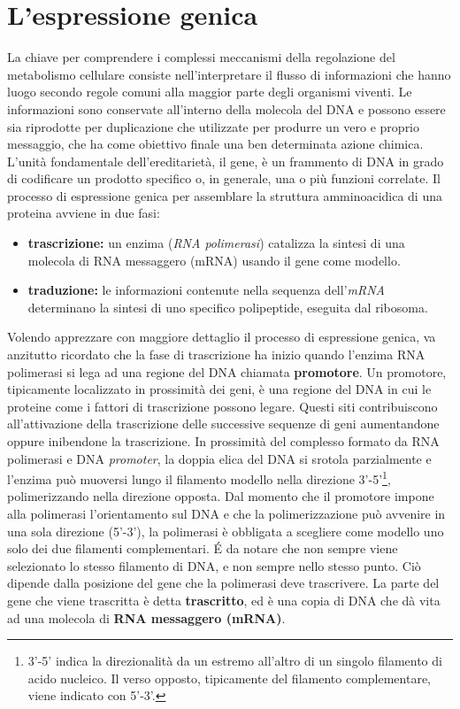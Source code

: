 \section{L'espressione genica}
\label{sec:genica}
La chiave per comprendere i complessi meccanismi della regolazione del metabolismo cellulare consiste nell'interpretare il flusso di informazioni che hanno luogo secondo regole comuni alla maggior parte degli organismi viventi. Le informazioni sono conservate all'interno della molecola del DNA e possono essere sia riprodotte per duplicazione che utilizzate per produrre un vero e proprio messaggio, che ha come obiettivo finale una ben determinata azione chimica. 
L'unità fondamentale dell'ereditarietà, il gene, è un frammento di DNA in grado di codificare un prodotto specifico o, in generale, una o più funzioni correlate. 
Il processo di espressione genica per assemblare la struttura amminoacidica di una proteina avviene in due fasi:
\begin{itemize}
\item \textbf{trascrizione:} un enzima (\textit{RNA polimerasi}) catalizza la sintesi di una molecola di RNA messaggero (mRNA) usando il gene come modello.
\item \textbf{traduzione:} le informazioni contenute nella sequenza dell'\textit{mRNA} determinano la sintesi di uno specifico polipeptide, eseguita dal ribosoma.
\end{itemize}

Volendo apprezzare con maggiore dettaglio il processo di espressione genica, va anzitutto ricordato che la fase di trascrizione ha inizio quando l'enzima RNA polimerasi si lega ad una regione del DNA chiamata \textbf{promotore}. 
Un promotore, tipicamente localizzato in prossimità dei geni, è una regione del DNA in cui le proteine come i fattori di trascrizione possono legare. 
Questi siti contribuiscono all'attivazione della trascrizione delle successive sequenze di geni aumentandone oppure inibendone la trascrizione. 
In prossimità del complesso formato da RNA polimerasi e DNA \textit{promoter}, la doppia elica del DNA si srotola parzialmente e l'enzima può muoversi lungo il filamento modello nella direzione 3'-5'\footnote{3'-5' indica la direzionalità da un estremo all'altro di un singolo filamento di acido nucleico. Il verso opposto, tipicamente del filamento complementare, viene indicato con 5'-3'.}, polimerizzando nella direzione opposta.
Dal momento che il promotore impone alla polimerasi l'orientamento sul DNA e che la polimerizzazione può avvenire in una sola direzione (5'-3'), la polimerasi è obbligata a scegliere come modello uno solo dei due filamenti complementari. 
\'E da notare che non sempre viene selezionato lo stesso filamento di DNA, e non sempre nello stesso punto. Ciò dipende dalla posizione del gene che la polimerasi deve trascrivere.
La parte del gene che viene trascritta è detta \textbf{trascritto}, ed è una copia di DNA che dà vita ad una molecola di \textbf{RNA messaggero (mRNA)}.

